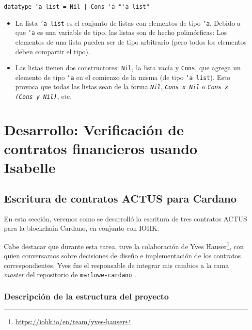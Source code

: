 \documentclass[12pt]{book}
\begin{document}
\begin{lstlisting}[upquote=true, mathescape=true, basicstyle=\ttfamily]
	datatype 'a list = Nil | Cons 'a "'a list"
\end{lstlisting}

\begin{itemize}
	\item La lista \texttt{'a list} es el conjunto de listas con elementos de tipo \texttt{'a}. Debido a que \texttt{'a} es una variable de tipo, las listas son de hecho polimórficas: Los elementos de una lista pueden ser de tipo arbitrario (pero todos los elementos deben compartir el tipo).

	\item Las listas tienen dos constructores: \texttt{Nil}, la lista vacía y \texttt{Cons}, que agrega un elemento de tipo \texttt{'a} en el comienzo de la misma (de tipo \texttt{'a list}). Esto provoca que todas las listas sean de la forma \textit{\texttt{Nil}}, \textit{\texttt{Cons x Nil}} o \textit{\texttt{Cons x (Cons y Nil)}}, etc.
	
\end{itemize}



\chapter[Verificación de contratos financieros en Isabelle]{Desarrollo: Verificación de contratos financieros usando Isabelle}
\section{Escritura de contratos ACTUS para Cardano}

En esta sección, veremos como se desarrolló la escritura de tres contratos ACTUS para la blockchain Cardano, en conjunto con IOHK.\@

Cabe destacar que durante esta tarea, tuve la colaboración de Yves Hauser\footnote{\href{https://iohk.io/en/team/yves-hauser}{https://iohk.io/en/team/yves-hauser}}, con quien conversamos sobre decisiones de diseño e implementación de los contratos correspondientes. Yves fue el responsable de integrar mis cambios a la rama \textit{master} del repositorio de \texttt{marlowe-cardano} \cite{marlowe-cardano-github}. %

\newpage
\subsection{Descripción de la estructura del proyecto}\label{sec:estructura}
\end{document}
